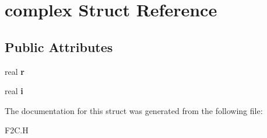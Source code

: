 \hypertarget{structcomplex}{\section{complex Struct Reference}
\label{structcomplex}
}
\subsection*{Public Attributes}
\begin{DoxyCompactItemize}
\item 
\hypertarget{structcomplex_a03cba9844d71e49f4ddf7c5f3dd45822}{real {\bfseries r}}\label{structcomplex_a03cba9844d71e49f4ddf7c5f3dd45822}

\item 
\hypertarget{structcomplex_aa55283d87e8d89c794bac746fb11d524}{real {\bfseries i}}\label{structcomplex_aa55283d87e8d89c794bac746fb11d524}

\end{DoxyCompactItemize}


The documentation for this struct was generated from the following file\+:\begin{DoxyCompactItemize}
\item 
F2\+C.\+H\end{DoxyCompactItemize}
